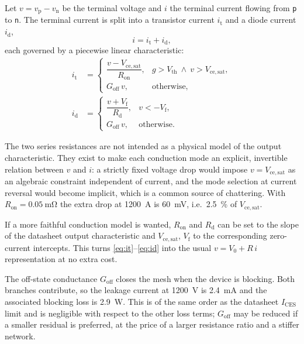 \documentclass[11pt,a4paper]{article}
\newcommand{\code}[1]{\texttt{\small #1}}
\begin{document}
Let $v = v_\mathrm{p} - v_\mathrm{n}$ be the terminal voltage and $i$ the
terminal current flowing from \code{p} to \code{n}. The terminal current is
split into a transistor current $i_\mathrm{t}$ and a diode current
$i_\mathrm{d}$,
\begin{equation}
  i = i_\mathrm{t} + i_\mathrm{d},
\end{equation}
each governed by a piecewise linear characteristic:
\begin{align}
  i_\mathrm{t} &=
  \begin{cases}
    \dfrac{v - V_\mathrm{ce,sat}}{R_\mathrm{on}}, &
      g > V_\mathrm{th} \ \wedge\ v > V_\mathrm{ce,sat},\\[2mm]
    G_\mathrm{off}\, v, & \text{otherwise},
  \end{cases}
  \label{eq:it}\\[2mm]
  i_\mathrm{d} &=
  \begin{cases}
    \dfrac{v + V_\mathrm{f}}{R_\mathrm{d}}, & v < -V_\mathrm{f},\\[2mm]
    G_\mathrm{off}\, v, & \text{otherwise}.
  \end{cases}
  \label{eq:id}
\end{align}

The two series resistances are not intended as a physical model of the output
characteristic. They exist to make each conduction mode an explicit, invertible
relation between $v$ and $i$: a strictly fixed voltage drop would impose
$v = V_\mathrm{ce,sat}$ as an algebraic constraint independent of current, and
the mode selection at current reversal would become implicit, which is a common
source of chattering. With $R_\mathrm{on} = \SI{0.05}{\milli\ohm}$ the extra
drop at \SI{1200}{\ampere} is \SI{60}{\milli\volt}, i.e.\ \SI{2.5}{\percent} of
$V_\mathrm{ce,sat}$.

If a more faithful conduction model is wanted, $R_\mathrm{on}$ and $R_\mathrm{d}$
can be set to the slope of the datasheet output characteristic and
$V_\mathrm{ce,sat}$, $V_\mathrm{f}$ to the corresponding zero-current
intercepts. This turns \eqref{eq:it}--\eqref{eq:id} into the usual
$v = V_0 + R\,i$ representation at no extra cost.

The off-state conductance $G_\mathrm{off}$ closes the mesh when the device is
blocking. Both branches contribute, so the leakage current at
\SI{1200}{\volt} is \SI{2.4}{\milli\ampere} and the associated blocking loss is
\SI{2.9}{\watt}. This is of the same order as the datasheet $I_\mathrm{CES}$
limit and is negligible with respect to the other loss terms; $G_\mathrm{off}$
may be reduced if a smaller residual is preferred, at the price of a larger
resistance ratio and a stiffer network.
\end{document}

